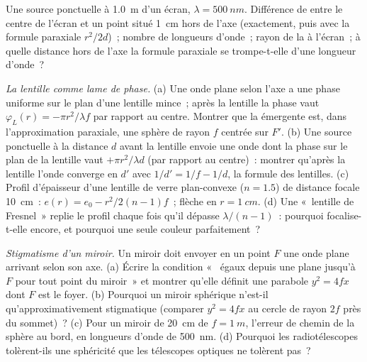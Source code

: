 \begin{exercise}[$\star$]\label{exo:b2:scalar-light-model:4}
Une source ponctuelle à \qty{1.0}{m} d'un écran, $\lambda = \qty{500}{nm}$. Différence de
 entre le centre de l'écran et un point situé \qty{1}{cm}
hors de l'axe (exactement, puis avec la formule paraxiale $r^2/2d$)~; nombre de
longueurs d'onde~; rayon de la  à l'écran~; à quelle distance hors de l'axe
la formule paraxiale se trompe-t-elle d'une longueur d'onde~?
\end{exercise}

\begin{exercise}[$\star\star$]\label{exo:b2:scalar-light-model:5}
\emph{La lentille comme lame de phase.} (a) Une onde plane selon l'axe a une
phase uniforme sur le plan d'une lentille mince~; après la lentille la phase vaut
$\varphi_L(r) = -\pi r^2/\lambda f$ par rapport au centre. Montrer que la 
émergente est, dans l'approximation paraxiale, une sphère de rayon $f$
centrée sur $F'$. (b) Une source ponctuelle à la distance $d$ avant la lentille
envoie une onde dont la phase sur le plan de la lentille vaut $+\pi r^2/\lambda d$ (par rapport
au centre)~: montrer qu'après la lentille l'onde converge en $d'$ avec
$1/d' = 1/f - 1/d$, la formule des lentilles. (c) Profil d'épaisseur d'une
lentille de verre plan-convexe ($n = 1.5$) de distance focale \qty{10}{cm}~: $e(r) =
e_0 - r^2/2(n - 1)f$~; flèche en $r = \qty{1}{cm}$. (d) Une «~lentille de Fresnel~» replie
le profil chaque fois qu'il dépasse $\lambda/(n - 1)$~: pourquoi focalise-t-elle encore,
et pourquoi une seule couleur parfaitement~?
\end{exercise}

\begin{exercise}[$\star\star$]\label{exo:b2:scalar-light-model:6}
\emph{Stigmatisme d'un miroir.} Un miroir doit envoyer en un point $F$ une onde plane
arrivant selon son axe. (a) Écrire la condition «~ égaux
depuis une  plane jusqu'à $F$ pour tout point du miroir~» et
montrer qu'elle définit une parabole $y^2 = 4fx$ dont $F$ est le foyer. (b) Pourquoi un
miroir sphérique n'est-il qu'approximativement stigmatique (comparer $y^2 = 4fx$ au
cercle de rayon $2f$ près du sommet)~? (c) Pour un miroir de \qty{20}{cm}
de $f = \qty{1}{m}$, l'erreur de chemin de la sphère au bord, en
longueurs d'onde de \qty{500}{nm}. (d) Pourquoi les radiotélescopes tolèrent-ils une
sphéricité que les télescopes optiques ne tolèrent pas~?
\end{exercise}

